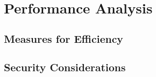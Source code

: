 \chapter{Performance Analysis}\label{chapter:analysis}

\section{Measures for Efficiency}
\section{Security Considerations}